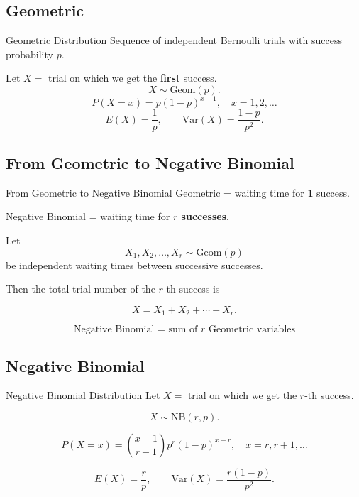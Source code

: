 \documentclass{beamer}
\begin{document}
\subsection{Geometric}

\begin{frame}{Geometric Distribution}
Sequence of independent Bernoulli trials with success probability $p$.

Let $X=$ trial on which we get the \textbf{first} success.
\[
X \sim \mathrm{Geom}(p).
\]
\pause
\[
P(X=x)=p(1-p)^{x-1},\quad x=1,2,\dots
\]
\pause
\[
E(X)=\frac{1}{p},\qquad 
\mathrm{Var}(X)=\frac{1-p}{p^2}.
\]
\end{frame}

\subsection{From Geometric to Negative Binomial}

\begin{frame}{From Geometric to Negative Binomial}
Geometric = waiting time for \textbf{1} success.

Negative Binomial = waiting time for \textbf{$r$ successes}.

\pause

Let
\[
X_1, X_2, \dots, X_r \sim \mathrm{Geom}(p)
\]
be independent waiting times between successive successes.

\pause

Then the total trial number of the $r$-th success is

\[
X = X_1 + X_2 + \cdots + X_r.
\]

\pause

\[
\boxed{\text{Negative Binomial = sum of } r \text{ Geometric variables}}
\]
\end{frame}

\subsection{Negative Binomial}

\begin{frame}{Negative Binomial Distribution}
Let $X=$ trial on which we get the $r$-th success.

\[
X \sim \mathrm{NB}(r,p).
\]

\pause

\[
P(X=x)=\binom{x-1}{r-1}p^{r}(1-p)^{x-r},
\quad x=r,r+1,\dots
\]

\pause

\[
E(X)=\frac{r}{p},\qquad 
\mathrm{Var}(X)=\frac{r(1-p)}{p^2}.
\]
\end{frame}
\end{document}
